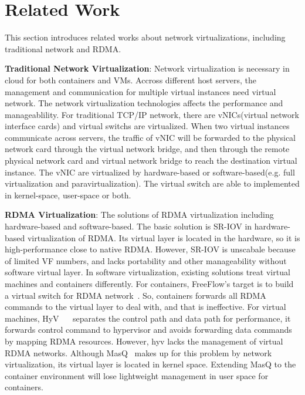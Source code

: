 \section{Related Work}
This section introduces related works about network virtualizations, including traditional network and RDMA.

\textbf{Traditional Network Virtualization}: Network virtualization is necessary in cloud for both containers and VMs. Accross different host servers, the management and communication for multiple virtual instances need virtual network. The network virtualization technologies affects the performance and manageablility. For traditional TCP/IP network, there are vNICs(virtual network interface cards) and virtual switchs are virtualized.  When two virtual instances communicate across servers, the traffic of vNIC will be forwarded to the physical network card through the virtual network bridge, and then through the remote physical network card and virtual network bridge to reach the destination virtual instance. The vNIC are virtualized by hardware-based or software-based(e.g. full virtualization and paravirtualization). The virtual switch are able to implemented in kernel-space, user-space or both.

\textbf{RDMA Virtualization}: The solutions of RDMA virtualization including hardware-based and software-based. The basic solution is SR-IOV in hardware-based virtualization of RDMA. Its virtual layer is located in the hardware, so it is high-performance close to native RDMA. However, SR-IOV is unscabale because of limited VF numbers, and lacks portability and other manageability without software virtual layer. In software virtualization, existing solutions treat virtual machines and containers differently. For containers, FreeFlow's target is to build a virtual switch for RDMA network~\cite{kim2019freeflow}. So, containers forwards all RDMA commands to the virtual layer to deal with, and that is ineffective. For virtual machines, HyV~\cite{pfefferle2015hybrid} ~\cite{pfefferle2014vverbs} separates the control path and data path for performance, it forwards control command to hypervisor and avoids forwarding data commands by mapping RDMA resources. However, hyv lacks the management of virtual RDMA networks. Although MasQ~\cite{he2020masq} makes up for this problem by network virtualization, its virtual layer is located in kernel space. Extending MasQ to the container environment will lose lightweight  management in user space for containers.

